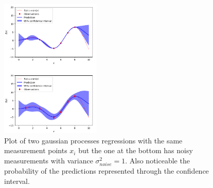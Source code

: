 \begin{figure}[h!]
	\centering
	\includegraphics[width=0.425\textwidth]{images/gaussian_process_example.png}
	\caption{
			Plot of two gaussian processes regressions with the same measurement points $x_i$
			but the one at the bottom has noisy measurements with variance $\sigma_{noise}^2 = 1$.
			Also noticeable the probability of the predictions represented through the confidence interval.
        }
	\label{fig:gaussian_process_example}
\end{figure}

